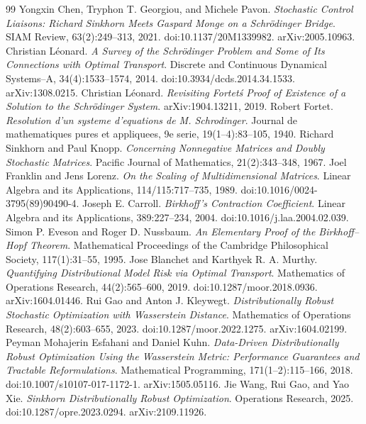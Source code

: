 \begin{thebibliography}{99}
 Yongxin Chen, Tryphon T. Georgiou, and Michele Pavon. \emph{Stochastic Control Liaisons: Richard Sinkhorn Meets Gaspard Monge on a Schr\"odinger Bridge}. SIAM Review, 63(2):249--313, 2021. doi:10.1137/20M1339982. arXiv:2005.10963.
 Christian L\'eonard. \emph{A Survey of the Schr\"odinger Problem and Some of Its Connections with Optimal Transport}. Discrete and Continuous Dynamical Systems--A, 34(4):1533--1574, 2014. doi:10.3934/dcds.2014.34.1533. arXiv:1308.0215.
 Christian L\'eonard. \emph{Revisiting Fortet\'s Proof of Existence of a Solution to the Schr\"odinger System}. arXiv:1904.13211, 2019.
 Robert Fortet. \emph{Resolution d'un systeme d'equations de M. Schrodinger}. Journal de mathematiques pures et appliquees, 9e serie, 19(1--4):83--105, 1940.
 Richard Sinkhorn and Paul Knopp. \emph{Concerning Nonnegative Matrices and Doubly Stochastic Matrices}. Pacific Journal of Mathematics, 21(2):343--348, 1967.
 Joel Franklin and Jens Lorenz. \emph{On the Scaling of Multidimensional Matrices}. Linear Algebra and its Applications, 114/115:717--735, 1989. doi:10.1016/0024-3795(89)90490-4.
 Joseph E. Carroll. \emph{Birkhoff's Contraction Coefficient}. Linear Algebra and its Applications, 389:227--234, 2004. doi:10.1016/j.laa.2004.02.039.
 Simon P. Eveson and Roger D. Nussbaum. \emph{An Elementary Proof of the Birkhoff--Hopf Theorem}. Mathematical Proceedings of the Cambridge Philosophical Society, 117(1):31--55, 1995.
 Jose Blanchet and Karthyek R. A. Murthy. \emph{Quantifying Distributional Model Risk via Optimal Transport}. Mathematics of Operations Research, 44(2):565--600, 2019. doi:10.1287/moor.2018.0936. arXiv:1604.01446.
 Rui Gao and Anton J. Kleywegt. \emph{Distributionally Robust Stochastic Optimization with Wasserstein Distance}. Mathematics of Operations Research, 48(2):603--655, 2023. doi:10.1287/moor.2022.1275. arXiv:1604.02199.
 Peyman Mohajerin Esfahani and Daniel Kuhn. \emph{Data-Driven Distributionally Robust Optimization Using the Wasserstein Metric: Performance Guarantees and Tractable Reformulations}. Mathematical Programming, 171(1--2):115--166, 2018. doi:10.1007/s10107-017-1172-1. arXiv:1505.05116.
 Jie Wang, Rui Gao, and Yao Xie. \emph{Sinkhorn Distributionally Robust Optimization}. Operations Research, 2025. doi:10.1287/opre.2023.0294. arXiv:2109.11926.

\end{thebibliography}
